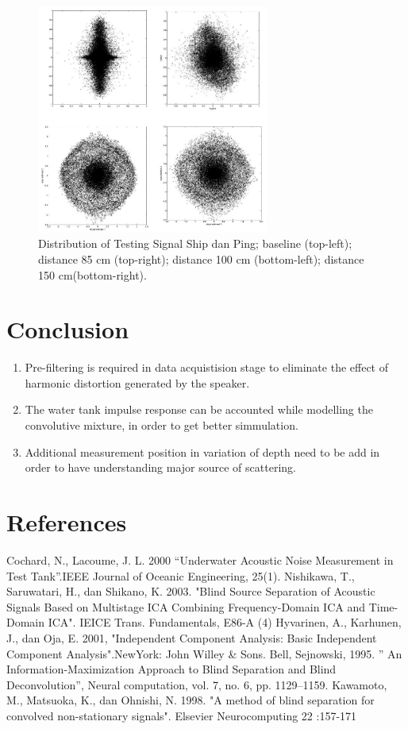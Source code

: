 \documentclass[a4paper]{jpconf}
\begin{document}
\begin{figure}[h]
\begin{center}
\includegraphics[width=3in]{gausDist.png}
\caption{\label{pict:gausDist}Distribution of Testing Signal Ship dan Ping; baseline (top-left); distance 85 cm (top-right); distance 100 cm (bottom-left); distance 150 cm(bottom-right).}
\end{center}
\end{figure}

\section{Conclusion}
\renewcommand{\theenumi}{\arabic{enumi}}
\begin{enumerate}
\item Pre-filtering is required in data acquistision stage to eliminate the effect of harmonic distortion generated by the speaker.
\item The water tank impulse response can be accounted while modelling the convolutive mixture, in order to get better simmulation.
\item Additional measurement position in variation of depth need to be add in order to have understanding major source of scattering.
\end{enumerate}

\section*{References}
\begin{thebibliography}{9}
 Cochard, N., Lacoume, J. L. 2000 “Underwater Acoustic Noise Measurement in Test Tank”.IEEE Journal of Oceanic Engineering, 25(1).
 Nishikawa, T., Saruwatari, H., dan Shikano, K. 2003. "Blind Source Separation of Acoustic Signals Based on Multistage ICA Combining Frequency-Domain ICA and Time-Domain ICA". IEICE Trans. Fundamentals, E86-A (4)
 Hyvarinen, A., Karhunen, J., dan Oja, E. 2001, "Independent Component Analysis: Basic Independent Component Analysis".NewYork: John Willey \& Sons.
 Bell, Sejnowski, 1995. ” An Information-Maximization Approach to Blind Separation and Blind Deconvolution”, Neural computation, vol. 7, no. 6, pp. 1129–1159.
 Kawamoto, M., Matsuoka, K., dan Ohnishi, N. 1998. "A method of blind separation for convolved non-stationary signals". Elsevier Neurocomputing 22 :157-171
\end{thebibliography}
\end{document}

